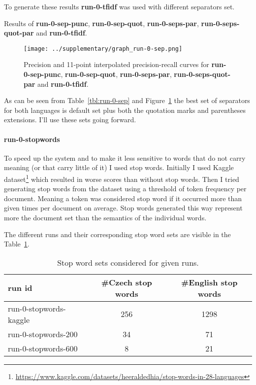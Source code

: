 \documentclass[10pt]{article}
\newcommand{\Run}[1]{\textbf{#1}}
\begin{document}
To generate these results \Run{run-0-tfidf} was used with different separators
set.

\begin{table}[h]
\centering

    \caption{Results of
    \Run{run-0-sep-punc}, \Run{run-0-sep-quot}, \Run{run-0-seps-par},
    \Run{run-0-seps-quot-par} and \Run{run-0-tfidf}.\label{tbl:run-0-sep}}
\end{table}

\begin{figure}[h]
\centering
\texttt{[image: ../supplementary/graph\_run-0-sep.png]}
    \caption{Precision and 11-point interpolated precision-recall curves for
    \Run{run-0-sep-punc}, \Run{run-0-sep-quot}, \Run{run-0-seps-par},
    \Run{run-0-seps-quot-par} and \Run{run-0-tfidf}.\label{fig:run-0-sep}}
\end{figure}

As can be seen from Table~\ref{tbl:run-0-sep} and Figure~\ref{fig:run-0-sep}
the best set of separators for both languages is default set plus both the
quotation marks and parentheses extensions. I'll use these sets going forward.


\paragraph{run-0-stopwords} To speed up the system and to make it less sensitive
to words that do not carry meaning (or that carry little of it) I used stop
words. Initially I used Kaggle
dataset\footnote{\url{https://www.kaggle.com/datasets/heeraldedhia/stop-words-in-28-languages}}
which resulted in worse scores than without stop words. Then I tried generating
stop words from the dataset using a threshold of token frequency per document.
Meaning a token was considered stop word if it occurred more than given times
per document on average. Stop words generated this way represent more the
document set than the semantics of the individual words.

The different runs and their corresponding stop word sets are visible in the
Table~\ref{tbl:run-0-stopwords_sets}.

\begin{table}[h]
    \centering
    \begin{tabular}{l | c c}
        run id & \#Czech stop words & \#English stop words \\
        \hline
        run-0-stopwords-kaggle & 256 & 1298\\
        run-0-stopwords-200 & 34 & 71\\
        run-0-stopwords-600 & 8 & 21\\
    \end{tabular}
    \caption{Stop word sets considered for given
    runs.\label{tbl:run-0-stopwords_sets}}
\end{table}
\end{document}
